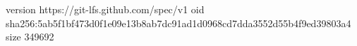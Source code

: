 version https://git-lfs.github.com/spec/v1
oid sha256:5ab5f1bf473d0f1e09e13b8ab7dc91ad1d0968cd7dda3552d55b4f9ed39803a4
size 349692
